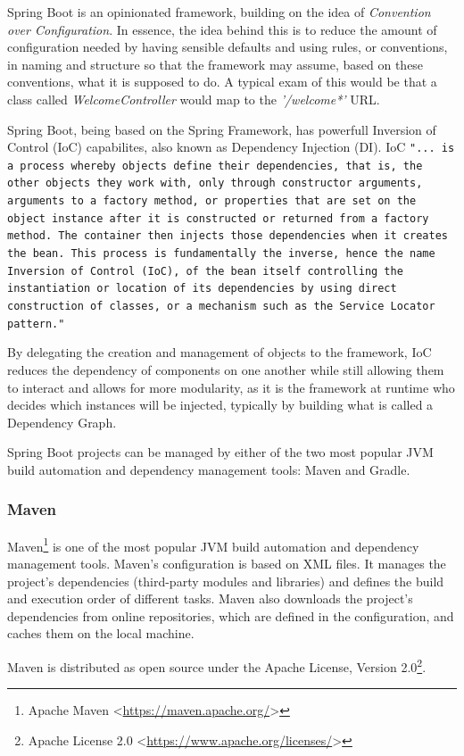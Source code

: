 Spring Boot is an opinionated framework, building on the idea of \textit{Convention over Configuration}. In essence, the idea behind this is to reduce the amount of configuration needed by having sensible defaults and using rules, or conventions, in naming and structure so that the framework may assume, based on these conventions, what it is supposed to do. A typical exam of this would be that a class called \textit{WelcomeController} would map to the \textit{'/welcome*'} URL\cite{convention-over-conf}.

Spring Boot, being based on the Spring Framework, has powerfull Inversion of Control (IoC) capabilites, also known as Dependency Injection (DI). IoC \texttt{"... is a process whereby objects define their dependencies, that is, the other objects they work with, only through constructor arguments, arguments to a factory method, or properties that are set on the object instance after it is constructed or returned from a factory method. The container then injects those dependencies when it creates the bean. This process is fundamentally the inverse, hence the name Inversion of Control (IoC), of the bean itself controlling the instantiation or location of its dependencies by using direct construction of classes, or a mechanism such as the Service Locator pattern."}\cite{ioc}

By delegating the creation and management of objects to the framework, IoC reduces the dependency of components on one another while still allowing them to interact and allows for more modularity, as it is the framework at runtime who decides which instances will be injected, typically by building what is called a Dependency Graph.

Spring Boot projects can be managed by either of the two most popular JVM build automation and dependency management tools: Maven and Gradle.
\subsubsection*{Maven}
Maven\footnote{Apache Maven <\url{https://maven.apache.org/}>} is one of the most popular JVM build automation and dependency management tools. Maven's configuration is based on XML files. It manages the project's dependencies (third-party modules and libraries) and defines the build and execution order of different tasks. Maven also downloads the project's dependencies from online repositories, which are defined in the configuration, and caches them on the local machine.

Maven is distributed as open source under the Apache License, Version 2.0\footnote{Apache License 2.0 <\url{https://www.apache.org/licenses/}>}.

